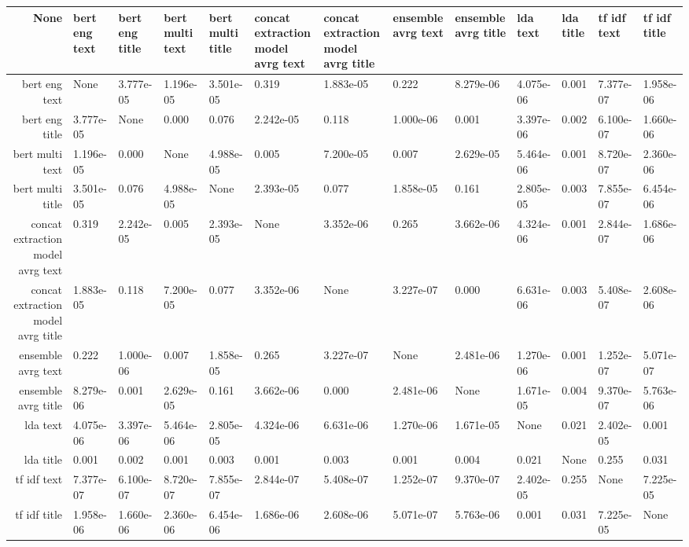 \begin{tabular}{|r|l|l|l|l|l|l|l|l|l|l|l|l|}
  \hline
  None & bert eng text & bert eng title & bert multi text & bert multi title & concat extraction model avrg text & concat extraction model avrg title & ensemble avrg text & ensemble avrg title & lda text & lda title & tf idf text & tf idf title \\ 
  \hline
  bert eng text & None & 3.777e-05 & 1.196e-05 & 3.501e-05 & 0.319 & 1.883e-05 & 0.222 & 8.279e-06 & 4.075e-06 & 0.001 & 7.377e-07 & 1.958e-06 \\ 
  \hline
  bert eng title & 3.777e-05 & None & 0.000 & 0.076 & 2.242e-05 & 0.118 & 1.000e-06 & 0.001 & 3.397e-06 & 0.002 & 6.100e-07 & 1.660e-06 \\ 
  \hline
  bert multi text & 1.196e-05 & 0.000 & None & 4.988e-05 & 0.005 & 7.200e-05 & 0.007 & 2.629e-05 & 5.464e-06 & 0.001 & 8.720e-07 & 2.360e-06 \\ 
  \hline
  bert multi title & 3.501e-05 & 0.076 & 4.988e-05 & None & 2.393e-05 & 0.077 & 1.858e-05 & 0.161 & 2.805e-05 & 0.003 & 7.855e-07 & 6.454e-06 \\ 
  \hline
  concat extraction model avrg text & 0.319 & 2.242e-05 & 0.005 & 2.393e-05 & None & 3.352e-06 & 0.265 & 3.662e-06 & 4.324e-06 & 0.001 & 2.844e-07 & 1.686e-06 \\ 
  \hline
  concat extraction model avrg title & 1.883e-05 & 0.118 & 7.200e-05 & 0.077 & 3.352e-06 & None & 3.227e-07 & 0.000 & 6.631e-06 & 0.003 & 5.408e-07 & 2.608e-06 \\ 
  \hline
  ensemble avrg text & 0.222 & 1.000e-06 & 0.007 & 1.858e-05 & 0.265 & 3.227e-07 & None & 2.481e-06 & 1.270e-06 & 0.001 & 1.252e-07 & 5.071e-07 \\ 
  \hline
  ensemble avrg title & 8.279e-06 & 0.001 & 2.629e-05 & 0.161 & 3.662e-06 & 0.000 & 2.481e-06 & None & 1.671e-05 & 0.004 & 9.370e-07 & 5.763e-06 \\ 
  \hline
  lda text & 4.075e-06 & 3.397e-06 & 5.464e-06 & 2.805e-05 & 4.324e-06 & 6.631e-06 & 1.270e-06 & 1.671e-05 & None & 0.021 & 2.402e-05 & 0.001 \\ 
  \hline
  lda title & 0.001 & 0.002 & 0.001 & 0.003 & 0.001 & 0.003 & 0.001 & 0.004 & 0.021 & None & 0.255 & 0.031 \\ 
  \hline
  tf idf text & 7.377e-07 & 6.100e-07 & 8.720e-07 & 7.855e-07 & 2.844e-07 & 5.408e-07 & 1.252e-07 & 9.370e-07 & 2.402e-05 & 0.255 & None & 7.225e-05 \\ 
  \hline
  tf idf title & 1.958e-06 & 1.660e-06 & 2.360e-06 & 6.454e-06 & 1.686e-06 & 2.608e-06 & 5.071e-07 & 5.763e-06 & 0.001 & 0.031 & 7.225e-05 & None \\ 
  \hline
\end{tabular}
